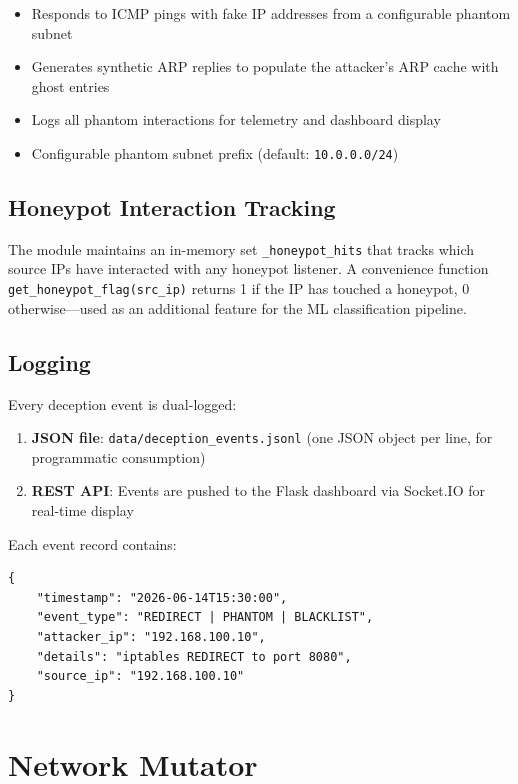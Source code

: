 \documentclass[12pt,a4paper]{article}
\begin{document}
\begin{itemize}[leftmargin=*, itemsep=3pt]
    \item Responds to ICMP pings with fake IP addresses from a configurable phantom subnet
    \item Generates synthetic ARP replies to populate the attacker's ARP cache with ghost entries
    \item Logs all phantom interactions for telemetry and dashboard display
    \item Configurable phantom subnet prefix (default: \texttt{10.0.0.0/24})
\end{itemize}

\subsection{Honeypot Interaction Tracking}

The module maintains an in-memory set \texttt{\_honeypot\_hits} that tracks which source IPs have interacted with any honeypot listener. A convenience function \texttt{get\_honeypot\_flag(src\_ip)} returns 1 if the IP has touched a honeypot, 0 otherwise---used as an additional feature for the ML classification pipeline.

\subsection{Logging}

Every deception event is dual-logged:

\begin{enumerate}[leftmargin=*, itemsep=3pt]
    \item \textbf{JSON file}: \texttt{data/deception\_events.jsonl} (one JSON object per line, for programmatic consumption)
    \item \textbf{REST API}: Events are pushed to the Flask dashboard via Socket.IO for real-time display
\end{enumerate}

Each event record contains:
\begin{lstlisting}[style=python, caption={Deception event record schema}]
{
    "timestamp": "2026-06-14T15:30:00",
    "event_type": "REDIRECT | PHANTOM | BLACKLIST",
    "attacker_ip": "192.168.100.10",
    "details": "iptables REDIRECT to port 8080",
    "source_ip": "192.168.100.10"
}
\end{lstlisting}

\section{Network Mutator}
\label{sec:mutator}
\end{document}
